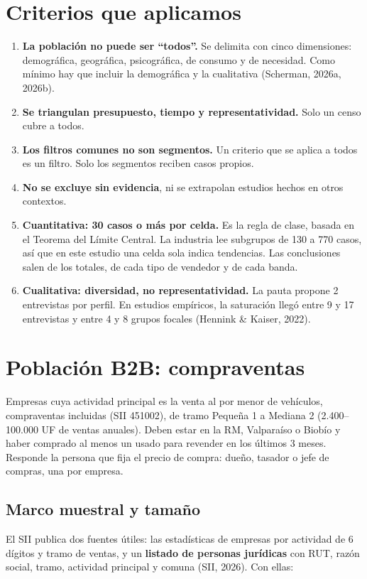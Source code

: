\documentclass[11pt,a4paper]{article}
\begin{document}
\section{Criterios que aplicamos}
\begin{enumerate}
\item \textbf{La población no puede ser \enquote{todos}.} Se delimita con cinco dimensiones: demográfica, geográfica, psicográfica, de consumo y de necesidad. Como mínimo hay que incluir la demográfica y la cualitativa (Scherman, 2026a, 2026b).
\item \textbf{Se triangulan presupuesto, tiempo y representatividad.} Solo un censo cubre a todos.
\item \textbf{Los filtros comunes no son segmentos.} Un criterio que se aplica a todos es un filtro. Solo los segmentos reciben casos propios.
\item \textbf{No se excluye sin evidencia}, ni se extrapolan estudios hechos en otros contextos.
\item \textbf{Cuantitativa: 30 casos o más por celda.} Es la regla de clase, basada en el Teorema del Límite Central. La industria lee subgrupos de 130 a 770 casos, así que en este estudio una celda sola indica tendencias. Las conclusiones salen de los totales, de cada tipo de vendedor y de cada banda.
\item \textbf{Cualitativa: diversidad, no representatividad.} La pauta propone 2 entrevistas por perfil. En estudios empíricos, la saturación llegó entre 9 y 17 entrevistas y entre 4 y 8 grupos focales (Hennink \& Kaiser, 2022).
\end{enumerate}

\section{Población B2B: compraventas}\label{sec:b2b}

\begin{keybox}[title=Definición]
Empresas cuya actividad principal es la venta al por menor de vehículos, compraventas incluidas (SII 451002), de tramo Pequeña 1 a Mediana 2 (2.400–100.000 UF de ventas anuales). Deben estar en la RM, Valparaíso o Biobío y haber comprado al menos un usado para revender en los últimos 3 meses. Responde la persona que fija el precio de compra: dueño, tasador o jefe de compras, una por empresa.
\end{keybox}

\subsection{Marco muestral y tamaño}
El SII publica dos fuentes útiles: las estadísticas de empresas por actividad de 6 dígitos y tramo de ventas, y un \textbf{listado de personas jurídicas} con RUT, razón social, tramo, actividad principal y comuna (SII, 2026). Con ellas:
\end{document}
